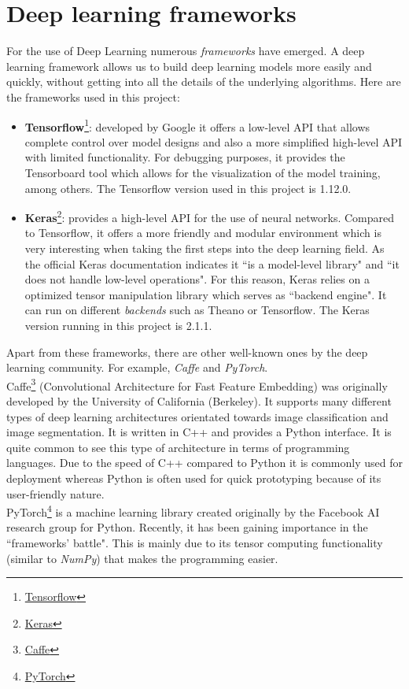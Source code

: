 \section{Deep learning frameworks}
For the use of Deep Learning numerous \textit{frameworks} have emerged. A deep learning framework allows us to build deep learning models more easily and quickly, without getting into all the details of the underlying algorithms. Here are the frameworks used in this project:
\begin{itemize}
\item \textbf{Tensorflow}\footnote {\href{https://www.tensorflow.org/}{Tensorflow}}: developed by Google it offers a low-level API that allows complete control over model designs and also a more simplified high-level API with limited functionality. For debugging purposes, it provides the Tensorboard tool which allows for the visualization of the model training, among others. The Tensorflow version used in this project is 1.12.0.
\item \textbf{Keras}\footnote {\href{https://keras.io/}{Keras}}: provides a high-level API for the use of neural networks. Compared to Tensorflow, it offers a more friendly and modular environment which is very interesting when taking the first steps into the deep learning field. As the official Keras documentation indicates it ``is a model-level library" and ``it does not handle low-level operations". For this reason, Keras relies on a optimized tensor manipulation library which serves as ``backend engine". It can run on different \textit{backends} such as Theano or Tensorflow. The Keras version running in this project is 2.1.1.
\end{itemize}
Apart from these frameworks, there are other well-known ones by the deep learning community. For example, \textit{Caffe} and \textit{PyTorch}.\\
Caffe\footnote {\href{https://caffe.berkeleyvision.org/}{Caffe}} (Convolutional Architecture for Fast Feature Embedding) was originally developed by the University of California (Berkeley). It supports many different types of deep learning architectures orientated towards image classification and image segmentation. It is written in C++ and provides a Python interface. It is quite common to see this type of architecture in terms of programming languages. Due to the speed of C++ compared to Python it is commonly used for deployment whereas Python is often used for quick prototyping because of its user-friendly nature.\\
PyTorch\footnote {\href{https://pytorch.org/}{PyTorch}} is a machine learning library created originally by the Facebook AI research group for Python. Recently, it has been gaining importance in the ``frameworks' battle". This is mainly due to its tensor computing functionality (similar to \textit{NumPy}) that makes the programming easier.

